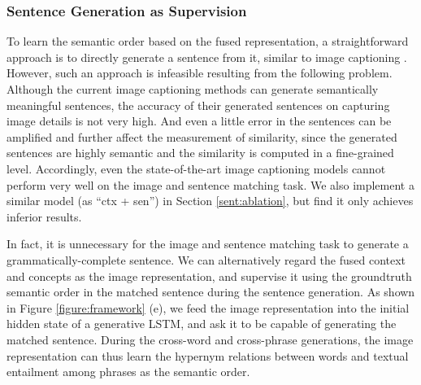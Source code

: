 \documentclass[10pt,twocolumn,letterpaper]{article}
\begin{document}
\subsubsection{Sentence Generation as Supervision} \label{sent:order}
\vspace{-1mm}
To learn the semantic order based on the fused representation,
a straightforward approach is to directly generate a sentence from it,
similar to image captioning \cite{wu2016value}.
However, such an approach is infeasible resulting from the following problem.
Although the current image captioning methods can
generate semantically meaningful sentences,
the accuracy of their generated sentences on capturing image details is not very high.
And even a little error in the sentences can be amplified
and further affect the measurement of similarity,
since the generated sentences are highly semantic and the similarity is computed in a fine-grained level.
Accordingly, even the state-of-the-art image captioning models
\cite{vinyals2017show,donahue2015long,mao2014explain}
cannot perform very well on the image and sentence matching task.
We also implement a similar model (as ``ctx + sen'') in Section \ref{sent:ablation},
but find it only achieves inferior results.



In fact, it is unnecessary for the image and sentence matching task
to generate a grammatically-complete sentence.
We can alternatively regard the fused context and concepts as the image representation,
and supervise it using the groundtruth semantic order in the matched sentence
during the sentence generation.
As shown in Figure \ref{figure:framework} (e),
we feed the image representation into the initial hidden state
of a generative LSTM, and ask it to be capable of generating the matched sentence.
During the cross-word and cross-phrase generations,
the image representation can thus learn
the hypernym relations between words and textual entailment among phrases
as the semantic order.
\end{document}
